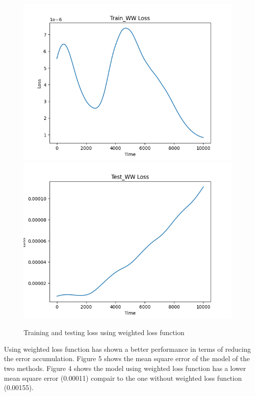 \documentclass[12pt, a4paper]{article}
\begin{document}
\begin{figure}
    \centering
    \includegraphics[scale=0.4]{../Train_WW_loss.png}
    \includegraphics[scale=0.4]{../Test_WW_loss.png}
    \caption[]{Training and testing loss using weighted loss function}
    \label{fig:loss_ww}
\end{figure}

Using weighted loss function has shown a better performance in terms of reducing the error accumulation. Figure 5 shows the mean square error of the model of the two methods. Figure 4 shows the model using weighted loss function has a lower mean square error (0.00011) compair to the one without weighted loss function (0.00155).
\end{document}
